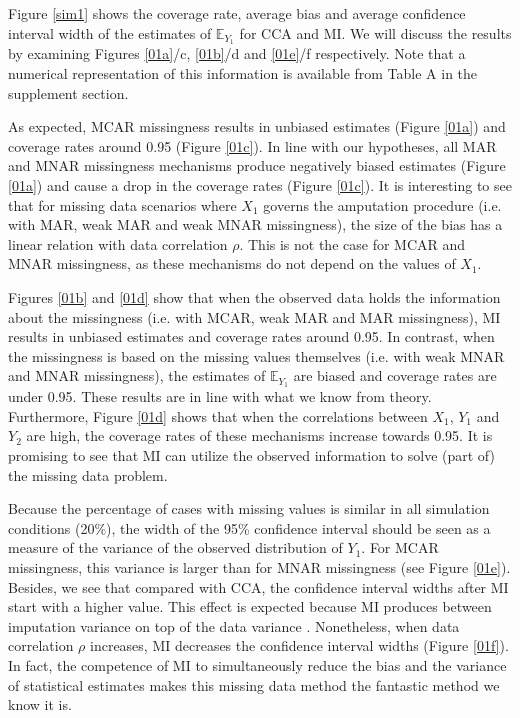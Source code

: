 \documentclass[11pt,a4paper]{article}
\begin{document}
Figure \ref{sim1} shows the coverage rate, average bias and average confidence interval width of the estimates of $\mathbb{E}_{Y_1}$ for CCA and MI. We will discuss the results by examining Figures \ref{01a}/c, \ref{01b}/d and \ref{01e}/f respectively. Note that a numerical representation of this information is available from Table A in the supplement section. 

As expected, MCAR missingness results in unbiased estimates (Figure \ref{01a}) and coverage rates around 0.95 (Figure \ref{01c}). In line with our hypotheses, all MAR and MNAR missingness mechanisms produce negatively biased estimates (Figure \ref{01a}) and cause a drop in the coverage rates (Figure \ref{01c}). It is interesting to see that for missing data scenarios where $X_1$ governs the amputation procedure (i.e. with MAR, weak MAR and weak MNAR missingness), the size of the bias has a linear relation with data correlation $\rho$. This is not the case for MCAR and MNAR missingness, as these mechanisms do not depend on the values of $X_1$. 

Figures \ref{01b} and \ref{01d} show that when the observed data holds the information about the missingness (i.e. with MCAR, weak MAR and MAR missingness), MI results in unbiased estimates and coverage rates around 0.95. In contrast, when the missingness is based on the missing values themselves (i.e. with weak MNAR and MNAR missingness), the estimates of $\mathbb{E}_{Y_1}$ are biased and coverage rates are under 0.95. These results are in line with what we know from theory. Furthermore, Figure \ref{01d} shows that when the correlations between $X_1$, $Y_1$ and $Y_2$ are high, the coverage rates of these mechanisms increase towards 0.95. It is promising to see that MI can utilize the observed information to solve (part of) the missing data problem. 

Because the percentage of cases with missing values is similar in all simulation conditions (20\%), the width of the 95\% confidence interval should be seen as a measure of the variance of the observed distribution of $Y_1$. For MCAR missingness, this variance is larger than for MNAR missingness (see Figure \ref{01e}). Besides, we see that compared with CCA, the confidence interval widths after MI start with a higher value. This effect is expected because MI produces between imputation variance on top of the data variance \citep{Rubin1987}. Nonetheless, when data correlation $\rho$ increases, MI decreases the confidence interval widths (Figure \ref{01f}). In fact, the competence of MI to simultaneously reduce the bias and the variance of statistical estimates makes this missing data method the fantastic method we know it is. 
\end{document}
